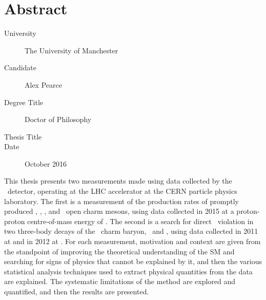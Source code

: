 \chapter{Abstract}

\begin{SingleSpace}

\begin{description}
  \item[University] The University of Manchester
  \item[Candidate] Alex Pearce
  \item[Degree Title] Doctor of Philosophy
  \item[Thesis Title] \thetitle
  \item[Date] October 2016
\end{description}

This thesis presents two measurements made using data collected by the \lhcb\ 
detector, operating at the \acl{LHC} accelerator at the CERN particle physics 
laboratory.
The first is a measurement of the production rates of promptly produced 
\PDzero, \PDplus, \PDsplus, and \PDstarp\ open charm mesons, using data 
collected in 2015 at a proton-proton centre-of-mass energy of .
The second is a search for direct \CP\ violation in two three-body decays of 
the \PLambdac\ charm baryon, \pKK\ and \ppipi, using data collected in 2011 at 
\sqrtseq{7} and in 2012 at \sqrtseq{8}.
For each measurement, motivation and context are given from the standpoint of 
improving the theoretical understanding of the \acl{SM} and searching for signs 
of physics that cannot be explained by it, and then the various statistical 
analysis techniques used to extract physical quantities from the data are 
explained.
The systematic limitations of the method are explored and quantified, and then 
the results are presented.

\end{SingleSpace}
